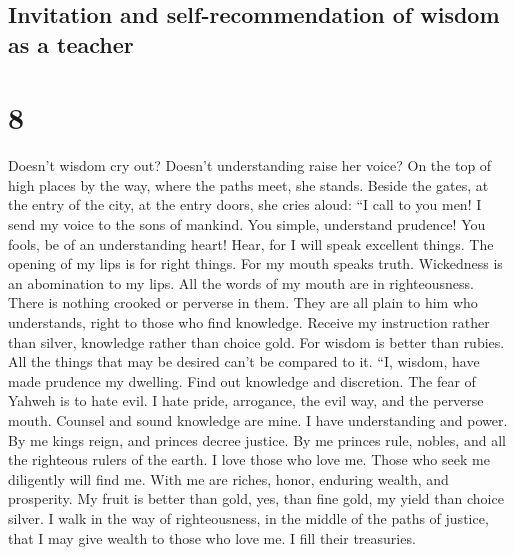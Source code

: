 \hypertarget{invitation-and-self-recommendation-of-wisdom-as-a-teacher}{%
\subsection{Invitation and self-recommendation of wisdom as a
teacher}\label{invitation-and-self-recommendation-of-wisdom-as-a-teacher}}

\hypertarget{section-7}{%
\section{8}\label{section-7}}

 Doesn't wisdom cry out? Doesn't understanding raise her
voice?  On the top of high places by the way, where the
paths meet, she stands.  Beside the gates, at the entry of
the city, at the entry doors, she cries aloud:  ``I call
to you men! I send my voice to the sons of mankind.  You
simple, understand prudence! You fools, be of an understanding heart!
 Hear, for I will speak excellent things. The opening of
my lips is for right things.  For my mouth speaks truth.
Wickedness is an abomination to my lips.  All the words of
my mouth are in righteousness. There is nothing crooked or perverse in
them.  They are all plain to him who understands, right to
those who find knowledge.  Receive my instruction rather
than silver, knowledge rather than choice gold.  For
wisdom is better than rubies. All the things that may be desired can't
be compared to it.  ``I, wisdom, have made prudence my
dwelling. Find out knowledge and discretion.  The fear of
Yahweh is to hate evil. I hate pride, arrogance, the evil way, and the
perverse mouth.  Counsel and sound knowledge are mine. I
have understanding and power.  By me kings reign, and
princes decree justice.  By me princes rule, nobles, and
all the righteous rulers of the earth.  I love those who
love me. Those who seek me diligently will find me.  With
me are riches, honor, enduring wealth, and prosperity. 
My fruit is better than gold, yes, than fine gold, my yield than choice
silver.  I walk in the way of righteousness, in the
middle of the paths of justice,  that I may give wealth
to those who love me. I fill their treasuries.

